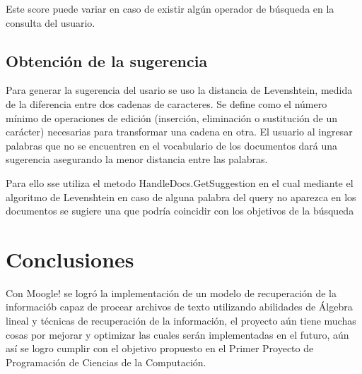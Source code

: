 \documentclass[a4paper,12pt]{article}
\begin{document}
	Este score puede variar en caso de existir algún operador de búsqueda en la consulta del usuario.

	\subsection{Obtención de la sugerencia}\label{sub:sugerencia}
	
	Para generar la sugerencia del usario se uso la distancia de Levenshtein, medida de la diferencia entre dos cadenas de caracteres. Se define como el número mínimo de operaciones de edición (inserción, eliminación o sustitución de un carácter) necesarias para transformar una cadena en otra. El usuario al ingresar palabras que no se encuentren en el vocabulario de los documentos dará una sugerencia asegurando la menor distancia entre las palabras.
		
	Para ello sse utiliza el metodo HandleDocs.GetSuggestion en el cual mediante el algoritmo de Levenshtein en caso de alguna palabra del query no aparezca en los documentos se sugiere una que podría coincidir con los objetivos de la búsqueda
	\newpage
	
	\section{Conclusiones}\label{sec:conclusiones}
	
	Con Moogle! se logró la implementación de un modelo de recuperación de la informaciób capaz de procear archivos de texto utilizando abilidades de Álgebra lineal y técnicas de recuperación de la información, el proyecto aún tiene muchas cosas por mejorar y optimizar las cuales serán implementadas en el futuro, aún así se logro cumplir con el objetivo propuesto en el Primer Proyecto de Programación de Ciencias de la Computación.
		
\end{document}
